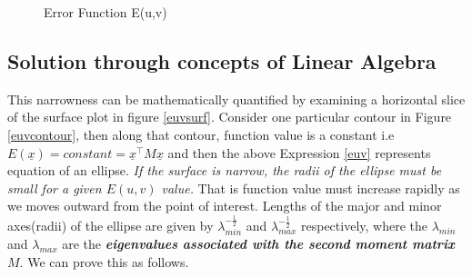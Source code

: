 \documentclass[a4paper,11pt]{article}%
\begin{document}
\begin{figure}[!h]
	\centering
	\hfill
	\caption{Error Function E(u,v) }

\end{figure}



\subsection{Solution through concepts of Linear Algebra}

This narrowness can be mathematically quantified by examining a horizontal slice of the surface plot in figure \ref{euvsurf}. Consider one particular contour in Figure \ref{euvcontour}, then along that contour, function value is a constant i.e $E(\underline{x}) = constant = \underline{x}^\top M \underline{x}$ and then the above Expression \ref{euv} represents equation of an ellipse. \textit{If the surface is narrow, the radii of the ellipse must be small for a given $E(u,v)$ value.} That is function value must increase rapidly as we moves outward from the point of interest. Lengths of the major and minor axes(radii) of the ellipse are given by $\lambda_{min}^{-\frac{1}{2}}$ and $\lambda_{max}^{-\frac{1}{2}}$ respectively, where the $\lambda_{min}$ and $\lambda_{max}$ are the \textbf{\textit{eigenvalues associated with the second moment matrix $M$}}. We can prove this as follows\cite{corner}.\\
\end{document}
